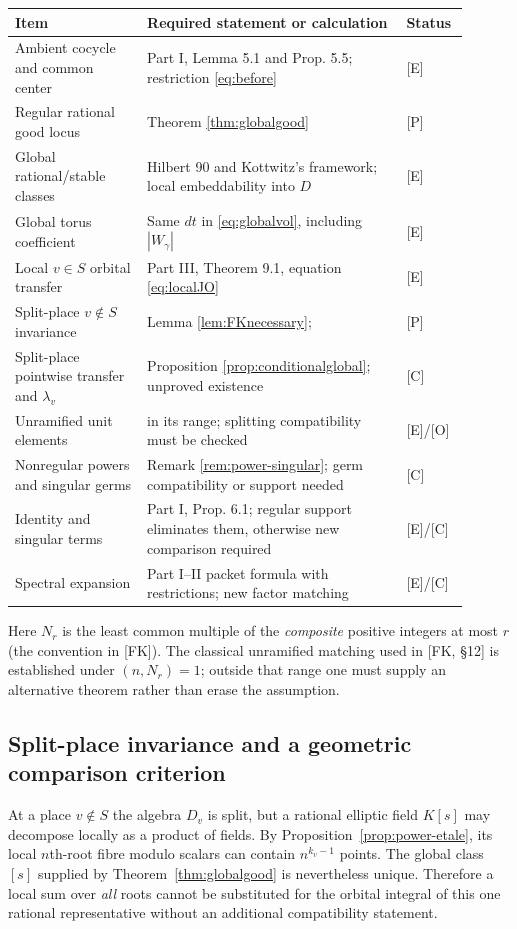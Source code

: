 \documentclass[11pt]{article}
\theoremstyle{plain}
\theoremstyle{definition}
\begin{document}
\begin{center}\small
\begin{longtable}{@{}p{0.27\linewidth}p{0.53\linewidth}p{0.10\linewidth}@{}}
\toprule
Item & Required statement or calculation & Status\\\midrule
\endhead
Ambient cocycle and common center & Part I, Lemma 5.1 and Prop. 5.5; restriction \eqref{eq:before} & [E]\\
Regular rational good locus & Theorem \ref{thm:globalgood} & [P]\\
Global rational/stable classes & Hilbert 90 and Kottwitz's framework; local embeddability into $D$ & [E]\\
Global torus coefficient & Same $dt$ in \eqref{eq:globalvol}, including $|W_\gamma|$ & [E]\\
Local $v\in S$ orbital transfer & Part III, Theorem 9.1, equation \eqref{eq:localJO} & [E]\\
Split-place $v\notin S$ invariance & Lemma \ref{lem:FKnecessary}; \cite[\S6]{FK} & [P]\\
Split-place pointwise transfer and $\lambda_v$ & Proposition \ref{prop:conditionalglobal}; unproved existence & [C]\\
Unramified unit elements & \cite[\S12]{FK} in its range; splitting compatibility must be checked & [E]/[O]\\
Nonregular powers and singular germs & Remark \ref{rem:power-singular}; germ compatibility or support needed & [C]\\
Identity and singular terms & Part I, Prop. 6.1; regular support eliminates them, otherwise new comparison required & [E]/[C]\\
Spectral expansion & Part I--II packet formula with restrictions; new factor matching & [E]/[C]\\
\bottomrule
\end{longtable}
\end{center}
Here $N_r$ is the least common multiple of the \emph{composite}
positive integers at most $r$ (the convention in [FK]).  The
classical unramified matching used in [FK, \S12] is established
under $(n,N_r)=1$; outside that range one must supply an alternative
theorem rather than erase the assumption.

\subsection{Split-place invariance and a geometric comparison criterion}
At a place $v\notin S$ the algebra $D_v$ is split, but a rational
elliptic field $K[s]$ may decompose locally as a product of fields.
By Proposition~\ref{prop:power-etale}, its local $n$th-root fibre
modulo scalars can contain $n^{k_v-1}$ points.  The global class
$[s]$ supplied by Theorem~\ref{thm:globalgood} is nevertheless
unique.  Therefore a local sum over \emph{all} roots cannot be substituted
for the orbital integral of this one rational representative without
an additional compatibility statement.
\end{document}
